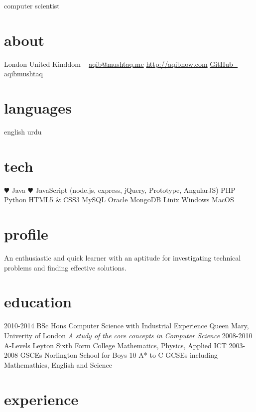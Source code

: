 \documentclass[]{friggeri-cv}
\begin{document}
       {computer scientist}

\begin{aside}
  \section{about}
    London
    United Kinddom
    ~
    \href{mailto:aqib@mushtaq.me}{aqib@mushtaq.me}
    \href{http://aqibnow.com}{http://aqibnow.com}
    \href{https://github.com/aqibmushtaq}{GitHub - aqibmushtaq}
  \section{languages}
    english
    urdu
  \section{tech}
    {\color{red} $\varheartsuit$} Java
    {\color{red} $\varheartsuit$} JavaScript
    (node.js, express, jQuery, Prototype, AngularJS)
    PHP
    Python
    HTML5 \& CSS3
    MySQL
    Oracle
    MongoDB
    Linix
    Windows
    MacOS
\end{aside}

\section{profile}

An enthusiastic and quick learner with an aptitude for investigating technical problems and finding effective solutions.

\section{education}

\begin{entrylist}
  \entry
    {2010-2014}
    {BSc Hons {\normalfont Computer Science with Industrial Experience}}
    {Queen Mary, Univerity of London}
    {\emph{A study of the core concepts in Computer Science}}
  \entry
    {2008-2010}
    {A-Levels}
    {Leyton Sixth Form College}
    {Mathematics, Physics, Applied ICT}
  \entry
    {2003-2008}
    {GSCEs}
    {Norlington School for Boys}
    {10 A* to C GCSEs including Mathemathics, English and Science}
\end{entrylist}

\section{experience}
\end{document}
